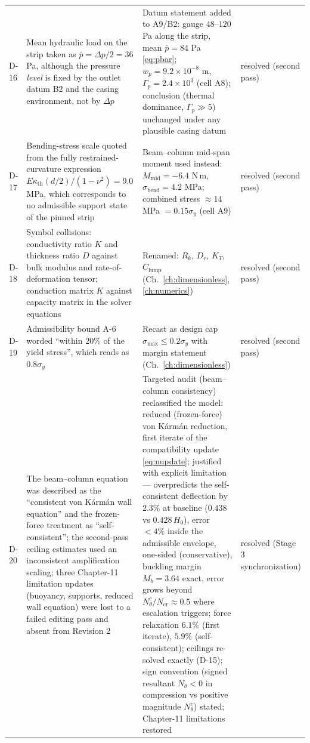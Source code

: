 \begin{longtable}{p{1cm}p{4.6cm}p{5.2cm}p{3.2cm}}
D-16 & Mean hydraulic load on the strip taken as $\bar p=\Delta p/2=36$ Pa, although the pressure \emph{level} is fixed by the outlet datum B2 and the casing environment, not by $\Delta p$ & Datum statement added to A9/B2: gauge $48$--$120$ Pa along the strip, mean $\bar p=84$ Pa \eqref{eq:pbar}; $w_p=9.2\times10^{-8}$ m, $\Gamma_p=2.4\times10^3$ (cell A8); conclusion (thermal dominance, $\Gamma_p\gg5$) unchanged under any plausible casing datum & resolved (second pass) \\
D-17 & Bending-stress scale quoted from the fully restrained-curvature expression $E\kappa_{\mathrm{th}}(d/2)/(1-\nu^2)=9.0$ MPa, which corresponds to no admissible support state of the pinned strip & Beam--column mid-span moment used instead: $M_{\mathrm{mid}}=-6.4$ N\,m, $\sigma_{\mathrm{bend}}=4.2$ MPa; combined stress $\approx14$ MPa $=0.15\sigma_y$ (cell A9) & resolved (second pass) \\
D-18 & Symbol collisions: conductivity ratio $K$ and thickness ratio $D$ against bulk modulus and rate-of-deformation tensor; conduction matrix $K$ against capacity matrix in the solver equations & Renamed: $R_k$, $D_r$, $K_T$, $C_{\mathrm{lump}}$ (Ch.~\ref{ch:dimensionless}, \ref{ch:numerics}) & resolved (second pass) \\
D-19 & Admissibility bound A-6 worded ``within $20\%$ of the yield stress'', which reads as $0.8\sigma_y$ & Recast as design cap $\sigma_{\max}\le0.2\sigma_y$ with margin statement (Ch.~\ref{ch:dimensionless}) & resolved (second pass) \\
D-20 & The beam--column equation was described as the ``consistent von K\'arm\'an wall equation'' and the frozen-force treatment as ``self-consistent''; the second-pass ceiling estimates used an inconsistent amplification scaling; three Chapter-11 limitation updates (buoyancy, supports, reduced wall equation) were lost to a failed editing pass and absent from Revision 2 & Targeted audit (beam--column consistency) reclassified the model: reduced (frozen-force) von K\'arm\'an reduction, first iterate of the compatibility update \eqref{eq:nupdate}; justified with explicit limitation --- overpredicts the self-consistent deflection by $2.3\%$ at baseline ($0.438$ vs $0.428\,H_0$), error $<4\%$ inside the admissible envelope, one-sided (conservative), buckling margin $M_b=3.64$ exact, error grows beyond $N_\theta^c/N_{\mathrm{cr}}\approx0.5$ where escalation triggers; force relaxation $6.1\%$ (first iterate), $5.9\%$ (self-consistent); ceilings re-solved exactly (D-15); sign convention (signed resultant $N_\theta<0$ in compression vs positive magnitude $N_\theta^c$) stated; Chapter-11 limitations restored & resolved (Stage 3 synchronization) \\

\end{longtable}
